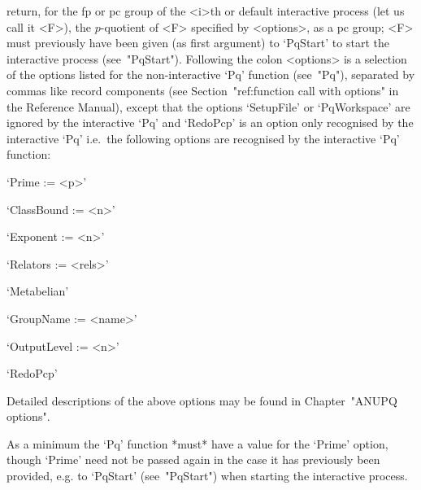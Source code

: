 return, for the fp or pc  group  of  the  <i>th  or  default  interactive
{\ANUPQ} process (let us call it <F>), the $p$-quotient of <F>  specified
by <options>, as a pc group; <F> must  previously  have  been  given  (as
first argument) to `PqStart' to start the  interactive  {\ANUPQ}  process
(see~"PqStart"). Following the colon <options>  is  a  selection  of  the
options  listed  for  the  non-interactive  `Pq'   function   (see~"Pq"),
separated by commas like  record  components  (see  Section~"ref:function
call with options" in the  {\GAP}  Reference  Manual),  except  that  the
options `SetupFile' or `PqWorkspace' are ignored by the interactive  `Pq'
and `RedoPcp' is an  option  only  recognised  by  the  interactive  `Pq'
i.e.~the  following  options  are  recognised  by  the  interactive  `Pq'
function:

\beginlist%

\item{}`Prime := <p>'

\item{}`ClassBound := <n>'

\item{}`Exponent := <n>'

\item{}`Relators := <rels>'

\item{}`Metabelian'

\item{}`GroupName := <name>'

\item{}`OutputLevel := <n>'

\item{}`RedoPcp'

\endlist

Detailed descriptions of the above options may be found in Chapter~"ANUPQ
options".

As a minimum the `Pq' function  *must*  have  a  value  for  the  `Prime'
option, though `Prime' need not be  passed  again  in  the  case  it  has
previously been provided, e.g. to `PqStart' (see~"PqStart") when starting
the interactive process.

